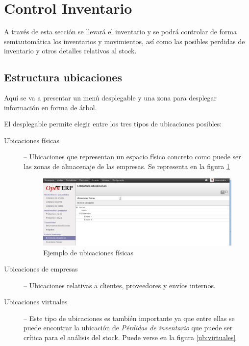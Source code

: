 





\section{Control Inventario}

A través de esta sección se llevará el inventario y se podrá controlar de forma semiautomática los inventarios y movimientos, así como las posibles perdidas de inventario y otros detalles relativos al stock.

\subsection{Estructura ubicaciones}
Aquí se va a presentar un menú desplegable y una zona para desplegar información en forma de árbol.

El desplegable permite elegir entre los tres tipos de ubicaciones posibles:
\begin{description}
  \item[Ubicaciones físicas] -- Ubicaciones que representan un espacio físico concreto como puede ser las zonas de almacenaje de las empresas. Se representa en la figura \ref{ub:fisicas}
\begin{figure}[H]
\includegraphics[width=\textwidth]{almacen/img/ubi_fisica.png}
\caption{Ejemplo de ubicaciones físicas}
\label{ub:fisicas}
\end{figure}

  \item[Ubicaciones de empresas] -- Ubicaciones relativas a clientes, proveedores y envíos internos.
  \item[Ubicaciones virtuales] -- Este tipo de ubicaciones es también importante ya que entre ellas se puede encontrar la ubicación de \emph{Pérdidas de inventario} que puede ser crítica para el análisis del stock. Puede verse en la figura \ref{ub:virtuales}
\end{description}


